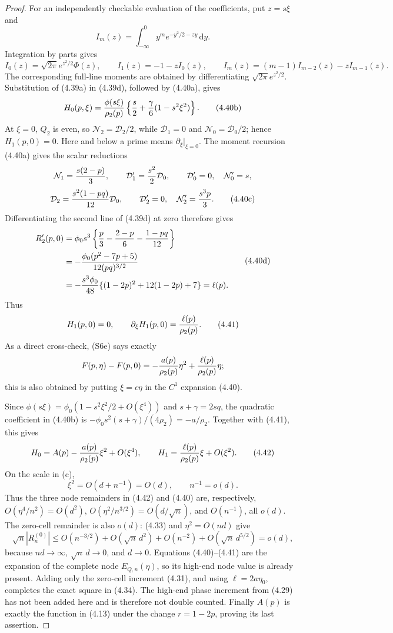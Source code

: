 \documentclass[11pt,a4paper]{article}
\numberwithin{equation}{section}
\theoremstyle{definition}
\theoremstyle{remark}
\newcommand{\dd}{\,\mathrm d}
\begin{document}
\begin{proof}
For an independently checkable evaluation of the coefficients, put
$z=s\xi$ and
\[
 I_m(z)=\int_{-\infty}^0y^m e^{-y^2/2-zy}\dd y.
\]
Integration by parts gives
\[
 I_0(z)=\sqrt{2\pi}e^{z^2/2}\Phi(z),\qquad
 I_1(z)=-1-zI_0(z),\qquad
 I_m(z)=(m-1)I_{m-2}(z)-zI_{m-1}(z).                  \tag{4.40a}
\]
The corresponding full-line moments are obtained by differentiating
$\sqrt{2\pi}e^{z^2/2}$.  Substitution of (4.39a) in (4.39d), followed by
(4.40a), gives
\[
 H_0(p,\xi)={\phi(s\xi)\over\rho_2(p)}
 \left\{{s\over2}+{\gamma\over6}(1-s^2\xi^2)\right\}.            \tag{4.40b}
\]
At $\xi=0$, $Q_2$ is even, so
$\mathcal N_2=\mathcal D_2/2$, while
$\mathcal D_1=0$ and $\mathcal N_0=\mathcal D_0/2$; hence $H_1(p,0)=0$.
Here and below a prime means $\partial_\xi|_{\xi=0}$.  The moment
recursion (4.40a) gives the scalar reductions
\[
 \mathcal N_1={s(2-p)\over3},\qquad
 \mathcal D_1'={s^2\over2}\mathcal D_0,\qquad
 \mathcal D_0'=0,\quad \mathcal N_0'=s,
\]
\[
 \mathcal D_2={s^2(1-pq)\over12}\mathcal D_0,\qquad
 \mathcal D_2'=0,\quad \mathcal N_2'={s^3p\over3}.             \tag{4.40c}
\]
Differentiating the second line of (4.39d) at zero therefore gives
\[
 \begin{aligned}
 R_2'(p,0)
 &=\phi_0s^3\left\{{p\over3}-{2-p\over6}-{1-pq\over12}\right\}\\
 &=-{\phi_0(p^2-7p+5)\over12(pq)^{3/2}}\\
 &=-{s^3\phi_0\over48}
             \{(1-2p)^2+12(1-2p)+7\}=\ell(p).
 \end{aligned}                                           \tag{4.40d}
\]
Thus
\[
 H_1(p,0)=0,\qquad
 \partial_\xi H_1(p,0)={\ell(p)\over\rho_2(p)}.       \tag{4.41}
\]
As a direct cross-check, (S6e) says exactly
\[
 F(p,\eta)-F(p,0)=-{a(p)\over\rho_2(p)}\eta^2
                         +{\ell(p)\over\rho_2(p)}\eta;
\]
this is also obtained by putting $\xi=\epsilon\eta$ in the
$C^1$ expansion (4.40).

Since $\phi(s\xi)=\phi_0(1-s^2\xi^2/2+O(\xi^4))$ and
$s+\gamma=2sq$, the quadratic coefficient in (4.40b) is
$-\phi_0s^2(s+\gamma)/(4\rho_2)=-a/\rho_2$.  Together with (4.41),
this gives
\[
 H_0=A(p)-{a(p)\over\rho_2(p)}\xi^2+O(\xi^4),\qquad
 H_1={\ell(p)\over\rho_2(p)}\xi+O(\xi^2).             \tag{4.42}
\]
On the scale in (c),
\[
 \xi^2=O(d+n^{-1})=O(d),\qquad n^{-1}=o(d).
\]
Thus the three node remainders in (4.42) and (4.40) are, respectively,
$O(\eta^4/n^2)=O(d^2)$,
$O(\eta^2/n^{3/2})=O(d/\sqrt n)$, and $O(n^{-1})$, all $o(d)$.
The zero-cell remainder is also $o(d)$: (4.33) and
$\eta^2=O(nd)$ give
\[
 \sqrt n|R_n^{(0)}|\le
 O(n^{-3/2})+O(\sqrt n\,d^2)
        +O(n^{-2})+O(\sqrt n\,d^{5/2})=o(d),          \tag{4.42a0}
\]
because $nd\to\infty$, $\sqrt n\,d\to0$, and $d\to0$.
Equations (4.40)--(4.41) are the expansion of the complete node
$E_{Q,n}(\eta)$, so its high-end node value is already present.  Adding
only the zero-cell increment (4.31), and using $\ell=2a\eta_0$, completes
the exact square in (4.34).  The high-end phase increment from (4.29) has
not been added here and is therefore not double counted.  Finally $A(p)$
is exactly the function in (4.13) under the change $r=1-2p$, proving its
last assertion.
\end{proof}
\end{document}
